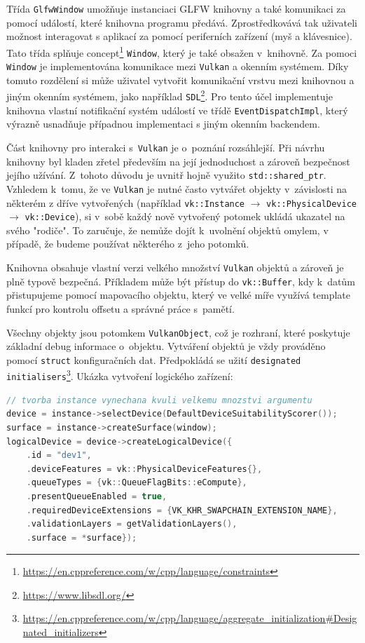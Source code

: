 Třída \texttt{GlfwWindow} umožňuje instanciaci GLFW knihovny a také komunikaci za pomocí událostí, které knihovna programu předává. Zprostředkovává tak uživateli možnost interagovat s aplikací za pomocí periferních zařízení (myš a klávesnice). Tato třída splňuje concept\footnote{\url{https://en.cppreference.com/w/cpp/language/constraints}} \texttt{Window}, který je také obsažen v~knihovně. Za pomoci \texttt{Window} je implementována komunikace mezi \texttt{Vulkan} a okenním systémem. Díky tomuto rozdělení si může uživatel vytvořit komunikační vrstvu mezi knihovnou a jiným okenním systémem, jako například \texttt{SDL}\footnote{\url{https://www.libsdl.org/}}. Pro tento účel implementuje knihovna vlastní notifikační systém událostí ve třídě \texttt{EventDispatchImpl}, který výrazně usnadňuje případnou implementaci s jiným okenním backendem.

Část knihovny pro interakci s~\texttt{Vulkan} je o~poznání rozsáhlejší. Při návrhu knihovny byl kladen zřetel především na její jednoduchost a zároveň bezpečnost jejího užívání. Z~tohoto důvodu je uvnitř hojně využito \texttt{std::shared\_ptr}. Vzhledem k~tomu, že ve \texttt{Vulkan} je nutné často vytvářet objekty v~závislosti na některém z dříve vytvořených (například \texttt{vk::Instance} $\longrightarrow$ \texttt{vk::PhysicalDevice} $\longrightarrow$ \texttt{vk::Device}), si v~sobě každý nově vytvořený potomek ukládá ukazatel na svého "rodiče". To zaručuje, že nemůže dojít k~uvolnění objektů omylem, v případě, že budeme používat některého z~jeho potomků.

Knihovna obsahuje vlastní verzi velkého množství \texttt{Vulkan} objektů a zároveň je plně typově bezpečná. Příkladem může být přístup do \texttt{vk::Buffer}, kdy k~datům přistupujeme pomocí mapovacího objektu, který ve velké míře využívá template funkcí pro kontrolu offsetu a správné práce s~pamětí.

Všechny objekty jsou potomkem \texttt{VulkanObject}, což je rozhraní, které poskytuje základní debug informace o~objektu. Vytváření objektů je vždy prováděno pomocí \texttt{struct} konfiguračních dat. Předpokládá se užití \texttt{designated initialisers}\footnote{\url{https://en.cppreference.com/w/cpp/language/aggregate_initialization#Designated_initializers}}. Ukázka vytvoření logického zařízení:

\begin{lstlisting}[language=C++, caption={Tvorba logického zařízení}]
// tvorba instance vynechana kvuli velkemu mnozstvi argumentu
device = instance->selectDevice(DefaultDeviceSuitabilityScorer());
surface = instance->createSurface(window);
logicalDevice = device->createLogicalDevice({
    .id = "dev1",
    .deviceFeatures = vk::PhysicalDeviceFeatures{},
    .queueTypes = {vk::QueueFlagBits::eCompute},
    .presentQueueEnabled = true,
    .requiredDeviceExtensions = {VK_KHR_SWAPCHAIN_EXTENSION_NAME},
    .validationLayers = getValidationLayers(),
    .surface = *surface});
\end{lstlisting}

